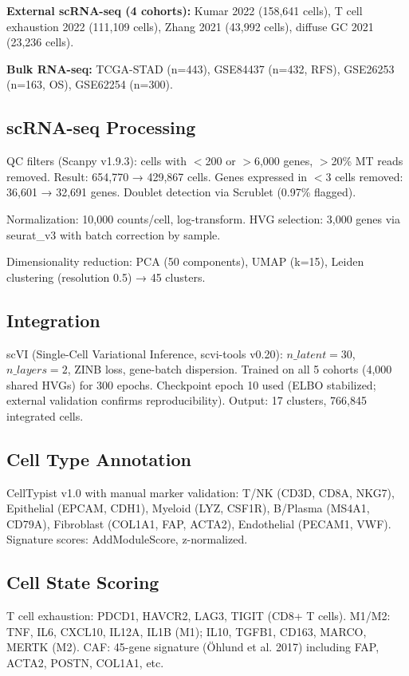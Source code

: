 \documentclass[12pt,twoside]{article}
\begin{document}
\textbf{External scRNA-seq (4 cohorts):} Kumar 2022 (158,641 cells), T cell exhaustion 2022 (111,109 cells), Zhang 2021 (43,992 cells), diffuse GC 2021 (23,236 cells).

\textbf{Bulk RNA-seq:} TCGA-STAD (n=443), GSE84437 (n=432, RFS), GSE26253 (n=163, OS), GSE62254 (n=300).

\subsection{scRNA-seq Processing}

QC filters (Scanpy v1.9.3): cells with $<$200 or $>$6,000 genes, $>$20\% MT reads removed. Result: 654,770 → 429,867 cells. Genes expressed in $<$3 cells removed: 36,601 → 32,691 genes. Doublet detection via Scrublet (0.97\% flagged).

Normalization: 10,000 counts/cell, log-transform. HVG selection: 3,000 genes via seurat\_v3 with batch correction by sample.

Dimensionality reduction: PCA (50 components), UMAP (k=15), Leiden clustering (resolution 0.5) → 45 clusters.

\subsection{Integration}

scVI (Single-Cell Variational Inference, scvi-tools v0.20): $n\_latent=30$, $n\_layers=2$, ZINB loss, gene-batch dispersion. Trained on all 5 cohorts (4,000 shared HVGs) for 300 epochs. Checkpoint epoch 10 used (ELBO stabilized; external validation confirms reproducibility). Output: 17 clusters, 766,845 integrated cells.

\subsection{Cell Type Annotation}

CellTypist v1.0 with manual marker validation: T/NK (CD3D, CD8A, NKG7), Epithelial (EPCAM, CDH1), Myeloid (LYZ, CSF1R), B/Plasma (MS4A1, CD79A), Fibroblast (COL1A1, FAP, ACTA2), Endothelial (PECAM1, VWF). Signature scores: AddModuleScore, z-normalized.

\subsection{Cell State Scoring}

T cell exhaustion: PDCD1, HAVCR2, LAG3, TIGIT (CD8+ T cells). M1/M2: TNF, IL6, CXCL10, IL12A, IL1B (M1); IL10, TGFB1, CD163, MARCO, MERTK (M2). CAF: 45-gene signature (Öhlund et al. 2017) including FAP, ACTA2, POSTN, COL1A1, etc.
\end{document}
